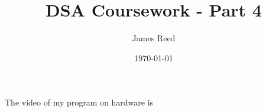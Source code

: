 \documentclass[12pt]{article}
\title{DSA Coursework - Part 4}
\author{James Reed}		%
\date{\today}					%
\begin{document}
\maketitle

The video of my program on hardware is 
\end{document}
